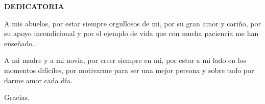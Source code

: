 \begin{center}
  {\Large  \bf{DEDICATORIA}}
\end{center}

\begin{center}
  A mis abuelos, por estar siempre orgullosos de mi, por su gran amor y cariño, por su apoyo incondicional y por el ejemplo de vida que con mucha paciencia me han enseñado.
\end{center}

\begin{center}
  A mi madre y a mi novia, por creer siempre en mi, por estar a mi lado en los momentos difíciles, por motivarme para ser una mejor persona y sobre todo por darme amor cada día.
\end{center}

\begin{center}
  Gracias.
\end{center}
